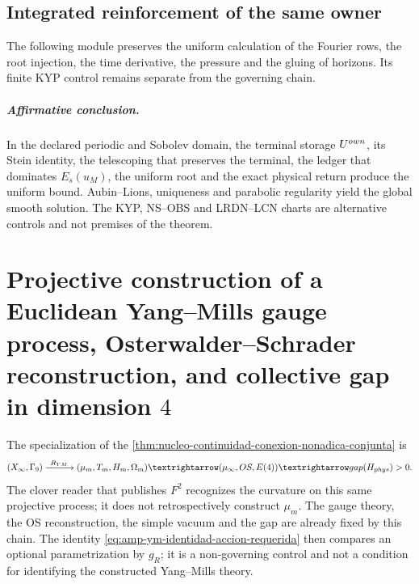 


\section*{Integrated reinforcement of the same owner}

The following module preserves the uniform calculation of the Fourier rows,
the root injection, the time derivative, the pressure and the gluing of
horizons. Its finite KYP control remains separate from the governing chain.



\paragraph{Affirmative conclusion.}
In the declared periodic and Sobolev domain, the terminal storage
\(U^{\rm own}\), its Stein identity, the telescoping that preserves the
terminal, the ledger that dominates \(E_s(u_M)\), the uniform root and the exact
physical return produce the uniform bound. Aubin--Lions, uniqueness and
parabolic regularity yield the global smooth solution. The KYP,
NS--OBS and LRDN--LCN charts are alternative controls and not premises of the theorem.

\chapter[Euclidean Yang--Mills gauge process in dimension 4]{Projective
construction of a Euclidean Yang--Mills gauge process, Osterwalder--Schrader
reconstruction, and collective gap in dimension \(4\)}

\noindent The specialization of the
\cref{thm:nucleo-continuidad-conexion-nonadica-conjunta} is
\[
 (\widehat X_\infty,\Gamma_9)
 \xrightarrow{\ \mathcal R_{\rm YM}\ }
 (\mu_m,T_m,H_m,\Omega_m)
 \longrightarrow(\mu_\infty,\mathrm{OS},E(4))
 \longrightarrow\operatorname{gap}(H_{\rm phys})>0.
\]
The clover reader that publishes \(F^2\) recognizes the curvature on this same
projective process; it does not retrospectively construct \(\mu_m\). The gauge
theory, the OS reconstruction, the simple vacuum and the gap are already fixed
by this chain. The identity
\eqref{eq:amp-ym-identidad-accion-requerida} then compares an
optional parametrization by \(g_R\); it is a non-governing control and not a
condition for identifying the constructed Yang--Mills theory.

